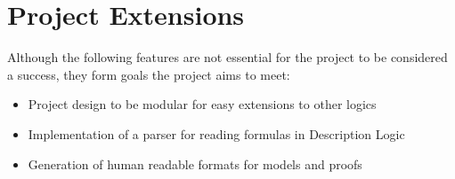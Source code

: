 \section{Project Extensions}

Although the following features are not essential for the project to be considered a success, they
form goals the project aims to meet:

\begin{itemize}
\item Project design to be modular for easy extensions to other logics
\item Implementation of a parser for reading formulas in Description Logic
\item Generation of human readable formats for models and proofs
\end{itemize}
